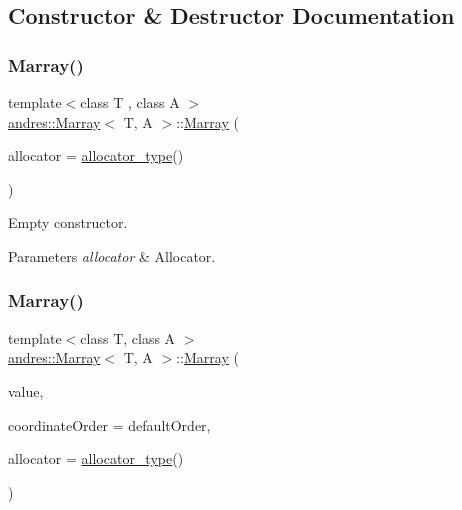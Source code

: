 \subsection{Constructor \& Destructor Documentation}
\mbox{\label{classandres_1_1Marray_ae04d0a668897b7c72eb548c303804254}} 
\subsubsection{\texorpdfstring{Marray()}{Marray()}\hspace{0.1cm}{\footnotesize\ttfamily [1/7]}}
{\footnotesize\ttfamily template$<$class T , class A $>$ \\
\hyperlink{classandres_1_1Marray}{andres\+::\+Marray}$<$ T, A $>$\+::\hyperlink{classandres_1_1Marray}{Marray} (\begin{DoxyParamCaption}\item[{const \hyperlink{classandres_1_1Marray_a1e38873cb38bd8568be81bfb804deefd}{allocator\+\_\+type} \&}]{allocator = {\ttfamily \hyperlink{classandres_1_1Marray_a1e38873cb38bd8568be81bfb804deefd}{allocator\+\_\+type}()} }\end{DoxyParamCaption})\hspace{0.3cm}{\ttfamily [inline]}}

Empty constructor.


\begin{DoxyParams}{Parameters}
{\em allocator} & Allocator. \\
\hline
\end{DoxyParams}
\mbox{\label{classandres_1_1Marray_af0c5c9182383cc5db6ce3ef36f039b7d}} 
\subsubsection{\texorpdfstring{Marray()}{Marray()}\hspace{0.1cm}{\footnotesize\ttfamily [2/7]}}
{\footnotesize\ttfamily template$<$class T, class A $>$ \\
\hyperlink{classandres_1_1Marray}{andres\+::\+Marray}$<$ T, A $>$\+::\hyperlink{classandres_1_1Marray}{Marray} (\begin{DoxyParamCaption}\item[{const T \&}]{value,  }\item[{const \hyperlink{namespaceandres_a2ac8b7aa89d44e8188a7c0ba50f4306b}{Coordinate\+Order} \&}]{coordinate\+Order = {\ttfamily defaultOrder},  }\item[{const \hyperlink{classandres_1_1Marray_a1e38873cb38bd8568be81bfb804deefd}{allocator\+\_\+type} \&}]{allocator = {\ttfamily \hyperlink{classandres_1_1Marray_a1e38873cb38bd8568be81bfb804deefd}{allocator\+\_\+type}()} }\end{DoxyParamCaption})\hspace{0.3cm}{\ttfamily [inline]}}

